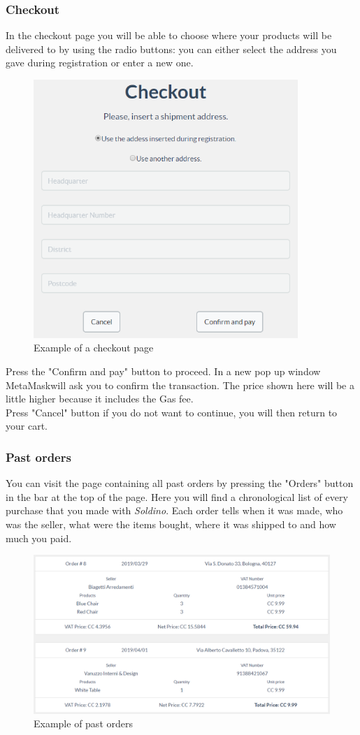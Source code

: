 		\subsubsection{Checkout}
		In the checkout page you will be able to choose where your products 
		will be delivered to by using the radio buttons: you can either select 
		the address you gave during registration or enter a new one.
	\begin{figure}[H]
		\includegraphics[width=10cm]{res/images/checkout.png}
		\centering
		\caption{Example of a checkout page}
	\end{figure}
	\noindent Press the "Confirm and pay" button to proceed. In a new 
	pop up window MetaMask\glosp will ask you to confirm the transaction. The price 
	shown here will be a little higher because it includes the Gas fee. \\
	Press "Cancel" button if you do not want to continue, you will then return to 
	your cart.
		\subsubsection{Past orders}
		You can visit the page containing all past orders by pressing the 
		"Orders" button in the bar at the top of the page.
		Here you will find a chronological list of every purchase that you made 
		with \textit{Soldino}. Each order tells when it was made, who was the 
		seller, what were the items bought, where it was shipped to and how 
		much you paid.
		\begin{figure}[H]
			\includegraphics[width=15cm]{res/images/past_orders.png}
			\centering
			\caption{Example of past orders}
		\end{figure}
